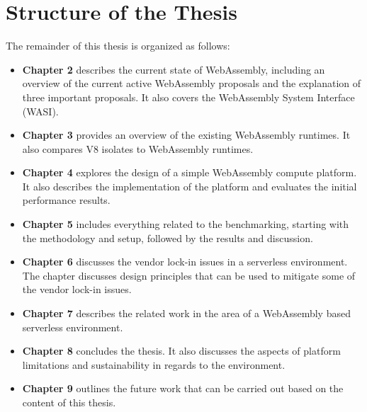 \section{Structure of the Thesis}
\label{sec:structure-of-the-thesis}

The remainder of this thesis is organized as follows:
\begin{itemize}
  \item \textbf{Chapter 2} describes the current state of WebAssembly, including an overview of the current active WebAssembly proposals and the explanation of three important proposals. It also covers the WebAssembly System Interface (WASI).
  \item \textbf{Chapter 3} provides an overview of the existing WebAssembly runtimes. It also compares \gls{V8} isolates to WebAssembly runtimes.
  \item \textbf{Chapter 4} explores the design of a simple WebAssembly compute platform. It also describes the implementation of the platform and evaluates the initial performance results.
  \item \textbf{Chapter 5} includes everything related to the benchmarking, starting with the methodology and setup, followed by the results and discussion.
  \item \textbf{Chapter 6} discusses the vendor lock-in issues in a serverless environment. The chapter discusses design principles that can be used to mitigate some of the vendor lock-in issues.
  \item \textbf{Chapter 7} describes the related work in the area of a WebAssembly based serverless environment.
  \item \textbf{Chapter 8} concludes the thesis. It also discusses the aspects of platform limitations and sustainability in regards to the environment.
  \item \textbf{Chapter 9} outlines the future work that can be carried out based on the content of this thesis.
\end{itemize}

